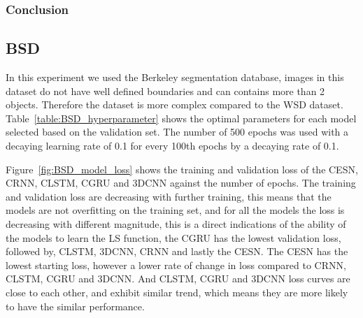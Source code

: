 \documentclass{WitsPhysicsReport}
\begin{document}
\subsubsection{Conclusion}



\newpage

\subsection{BSD}

In this experiment we used the Berkeley segmentation database, images in this dataset do not have well defined boundaries and can contains more than 2 objects. Therefore the dataset is more complex compared to the WSD dataset. Table~\ref{table:BSD_hyperparameter} shows the optimal parameters for each model selected based on the validation set. The number of 500 epochs was used with a decaying learning rate of 0.1 for every 100th epochs by a decaying rate of 0.1.

\begin{table}[H]
    \centering
        \caption{BSD optimal parameters for the CESN, CRNN, CLSTM, CGRU and 3DCNN}
    \label{table:BSD_hyperparameter}
\end{table}

Figure~\ref{fig:BSD_model_loss} shows the training and validation  loss of the CESN, CRNN, CLSTM, CGRU and 3DCNN against the number of epochs. The training and validation loss are decreasing with further training, this means that the models are not overfitting on the training set, and for all the models the loss is decreasing with different magnitude, this is a direct indications of the ability of the models to learn the LS function, the CGRU has the lowest validation loss, followed by, CLSTM, 3DCNN, CRNN and lastly the CESN. The CESN has the lowest starting loss, however a lower rate of change in loss compared to CRNN, CLSTM, CGRU and 3DCNN. And CLSTM, CGRU and 3DCNN loss curves are close to each other, and exhibit similar trend, which means they are more likely to have the similar performance.
\end{document}
